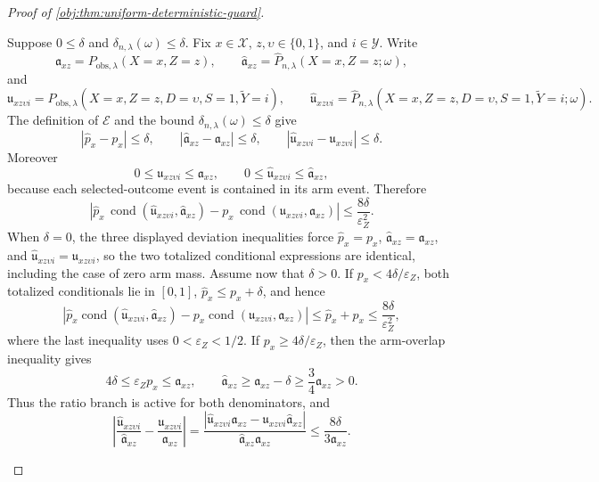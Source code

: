 \documentclass[11pt]{article}
\begin{document}
\begin{proof}[Proof of \cref{obj:thm:uniform-deterministic-guard}]
\begin{enumerate}
Suppose \(0\le \delta\) and \(\delta_{n,\lambda}(\omega)\le\delta\).  Fix \(x\in\mathcal X\), \(z,\upsilon\in\{0,1\}\), and \(i\in\mathcal Y\).  Write
\[
\mathfrak a_{xz}=P_{\mathrm{obs},\lambda}(X=x,Z=z),
\qquad
\widehat{\mathfrak a}_{xz}
=
\widehat P_{n,\lambda}(X=x,Z=z;\omega),
\]
and
\[
\mathfrak u_{xz\upsilon i}=P_{\mathrm{obs},\lambda}(X=x,Z=z,D=\upsilon,S=1,\widetilde Y=i),
\qquad
\widehat{\mathfrak u}_{xz\upsilon i}
=
\widehat P_{n,\lambda}(X=x,Z=z,D=\upsilon,S=1,\widetilde Y=i;\omega).
\]
The definition of \(\mathcal E\) and the bound
\(\delta_{n,\lambda}(\omega)\le\delta\) give
\[
|\widehat p_x-p_x|\le\delta,
\qquad
|\widehat{\mathfrak a}_{xz}-\mathfrak a_{xz}|\le\delta,
\qquad
|\widehat{\mathfrak u}_{xz\upsilon i}-\mathfrak u_{xz\upsilon i}|\le\delta.
\]
Moreover
\[
0\le \mathfrak u_{xz\upsilon i}\le \mathfrak a_{xz},
\qquad
0\le \widehat{\mathfrak u}_{xz\upsilon i}\le \widehat{\mathfrak a}_{xz},
\]
because each selected-outcome event is contained in its arm event.  Therefore
\[
\left|
\widehat p_x\,
\operatorname{cond}(\widehat{\mathfrak u}_{xz\upsilon i},\widehat{\mathfrak a}_{xz})
-
p_x\,
\operatorname{cond}(\mathfrak u_{xz\upsilon i},\mathfrak a_{xz})
\right|
\le
\frac{8\delta}{\varepsilon_Z^2}.
\]
When \(\delta=0\), the three displayed deviation inequalities force
\(\widehat p_x=p_x\), \(\widehat{\mathfrak a}_{xz}=\mathfrak a_{xz}\), and
\(\widehat{\mathfrak u}_{xz\upsilon i}=\mathfrak u_{xz\upsilon i}\), so the two totalized
conditional expressions are identical, including the case of zero arm mass.
Assume now that \(\delta>0\).  If \(p_x<4\delta/\varepsilon_Z\), both totalized
conditionals lie in \([0,1]\), \(\widehat p_x\le p_x+\delta\), and hence
\[
\left|
\widehat p_x\operatorname{cond}(\widehat{\mathfrak u}_{xz\upsilon i},\widehat{\mathfrak a}_{xz})
-
p_x\operatorname{cond}(\mathfrak u_{xz\upsilon i},\mathfrak a_{xz})
\right|
\le
\widehat p_x+p_x
\le
\frac{8\delta}{\varepsilon_Z^2},
\]
where the last inequality uses \(0<\varepsilon_Z<1/2\).  If
\(p_x\ge4\delta/\varepsilon_Z\), then the arm-overlap inequality gives
\[
4\delta\le \varepsilon_Zp_x\le\mathfrak a_{xz},
\qquad
\widehat{\mathfrak a}_{xz}\ge \mathfrak a_{xz}-\delta\ge\frac34\mathfrak a_{xz}>0.
\]
Thus the ratio branch is active for both denominators, and
\[
\left|
\frac{\widehat{\mathfrak u}_{xz\upsilon i}}{\widehat{\mathfrak a}_{xz}}
-
\frac{\mathfrak u_{xz\upsilon i}}{\mathfrak a_{xz}}
\right|
=
\frac{|\widehat{\mathfrak u}_{xz\upsilon i}\mathfrak a_{xz}-\mathfrak u_{xz\upsilon i}\widehat{\mathfrak a}_{xz}|}
{\widehat{\mathfrak a}_{xz}\mathfrak a_{xz}}
\le
\frac{8\delta}{3\mathfrak a_{xz}}.
\]
\end{enumerate}
\end{proof}
\end{document}
